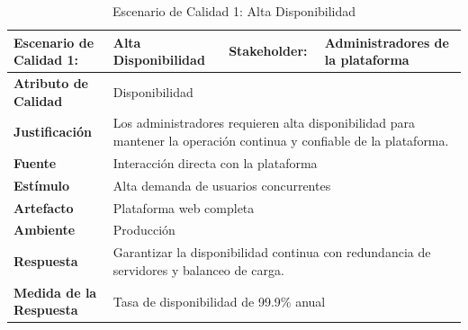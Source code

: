 \documentclass[12pt]{article}
\begin{document}
\begin{table}[H]
    \centering
    \begin{tabular}{|p{5cm}|p{3cm}|p{4cm}|p{4cm}|}
        \hline
        \multicolumn{1}{|p{5cm}|}{\cellcolor{teal!50}\textbf{Escenario de Calidad 1:}} & \multicolumn{1}{p{4cm}|}{Alta Disponibilidad} & \multicolumn{1}{l|}{\cellcolor{teal!50}\textbf{Stakeholder:}} & \multicolumn{1}{p{4cm}|}{Administradores de la plataforma} \\ \hline
        \multicolumn{1}{|p{5cm}|}{\cellcolor{teal!50}\textbf{Atributo de Calidad}}    & \multicolumn{3}{p{11cm}|}{Disponibilidad} \\ \hline
        \multicolumn{1}{|p{5cm}|}{\cellcolor{teal!50}\textbf{Justificación}}           & \multicolumn{3}{p{11cm}|}{Los administradores requieren alta disponibilidad para mantener la operación continua y confiable de la plataforma.} \\ \hline
        \multicolumn{1}{|p{5cm}|}{\cellcolor{teal!50}\textbf{Fuente}}                  & \multicolumn{3}{p{11cm}|}{Interacción directa con la plataforma} \\ \hline
        \multicolumn{1}{|p{5cm}|}{\cellcolor{teal!50}\textbf{Estímulo}}                & \multicolumn{3}{p{11cm}|}{Alta demanda de usuarios concurrentes} \\ \hline
        \multicolumn{1}{|p{5cm}|}{\cellcolor{teal!50}\textbf{Artefacto}}               & \multicolumn{3}{p{11cm}|}{Plataforma web completa} \\ \hline
        \multicolumn{1}{|p{5cm}|}{\cellcolor{teal!50}\textbf{Ambiente}}                & \multicolumn{3}{p{11cm}|}{Producción} \\ \hline
        \multicolumn{1}{|p{5cm}|}{\cellcolor{teal!50}\textbf{Respuesta}}               & \multicolumn{3}{p{11cm}|}{Garantizar la disponibilidad continua con redundancia de servidores y balanceo de carga.} \\ \hline
        \multicolumn{1}{|p{5cm}|}{\cellcolor{teal!50}\textbf{Medida de la Respuesta}}  & \multicolumn{3}{p{11cm}|}{Tasa de disponibilidad de 99.9\% anual} \\ \hline
    \end{tabular}
    \caption{Escenario de Calidad 1: Alta Disponibilidad}
    \label{tab:escenarios_calidad_1}
\end{table}
\end{document}
